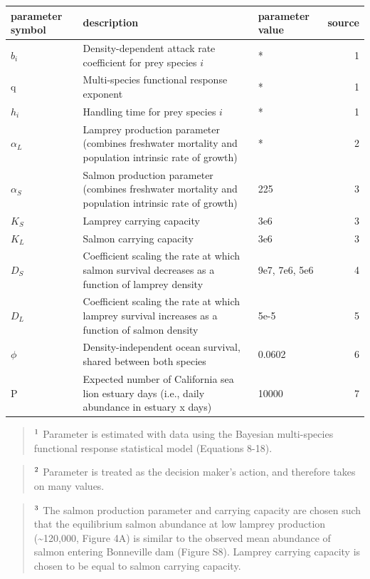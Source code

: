 \documentclass[
]{article}
\begin{document}
\begin{longtable}{l>{\raggedright\arraybackslash}p{8cm}lr}
\toprule
parameter
symbol & description & parameter
value & source\\
\midrule
$b_i$ & Density-dependent attack rate coefficient for prey species $i$ & * & 1\\
q & Multi-species functional response exponent & * & 1\\
$h_i$ & Handling time for prey species $i$ & * & 1\\
$\alpha_L$ & Lamprey production parameter (combines freshwater mortality and population intrinsic rate of growth) & * & 2\\
$\alpha_S$ & Salmon production parameter (combines freshwater mortality and population intrinsic rate of growth) & 225 & 3\\
\addlinespace
$K_S$ & Lamprey carrying capacity & 3e6 & 3\\
$K_L$ & Salmon carrying capacity & 3e6 & 3\\
$D_S$ & Coefficient scaling the rate at which salmon survival decreases as a function of lamprey density & 9e7, 7e6, 5e6 & 4\\
$D_L$ & Coefficient scaling the rate at which lamprey survival increases as a function of salmon density & 5e-5 & 5\\
$\phi$ & Density-independent ocean survival, shared between both species & 0.0602 & 6\\
\addlinespace
P & Expected number of California sea lion estuary days (i.e., daily abundance in estuary x days) & 10000 & 7\\
\bottomrule
\end{longtable}

\begin{quote}
\(\textsuperscript{1}\) Parameter is estimated with data using the
Bayesian multi-species functional response statistical model (Equations
8-18).
\end{quote}

\begin{quote}
\(\textsuperscript{2}\) Parameter is treated as the decision maker's
action, and therefore takes on many values.
\end{quote}

\begin{quote}
\(\textsuperscript{3}\) The salmon production parameter and carrying
capacity are chosen such that the equilibrium salmon abundance at low
lamprey production (\textasciitilde120,000, Figure 4A) is similar to the
observed mean abundance of salmon entering Bonneville dam (Figure S8).
Lamprey carrying capacity is chosen to be equal to salmon carrying
capacity.
\end{quote}
\end{document}

